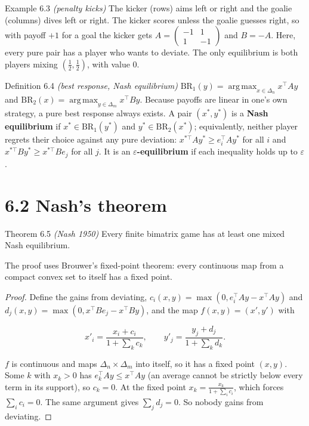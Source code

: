 \documentclass[11pt,a4paper,openany]{book}
\newcommand{\eps}{\varepsilon}
\DeclareMathOperator*{\argmax}{arg\,max}
\newcommand{\simplex}{\Delta}
\begin{document}
\begin{bexample}{Example 6.3 \emph{(penalty kicks)}}
The kicker (rows) aims left or right and the goalie (columns) dives left or right. The kicker scores unless the goalie guesses right, so with payoff $+1$ for a goal the kicker gets $A=\begin{pmatrix}-1&1\\1&-1\end{pmatrix}$ and $B=-A$. Here, every pure pair has a player who wants to deviate. The only equilibrium is both players mixing $(\tfrac12,\tfrac12)$, with value $0$.
\end{bexample}

\begin{bdef}{Definition 6.4 \emph{(best response, Nash equilibrium)}}
$\mathrm{BR}_1(y)=\argmax_{x\in\simplex_n}x^\top Ay$ and $\mathrm{BR}_2(x)=\argmax_{y\in\simplex_m}x^\top By$. Because payoffs are linear in one's own strategy, a pure best response always exists. A pair $(x^*,y^*)$ is a \textbf{Nash equilibrium} if $x^*\in\mathrm{BR}_1(y^*)$ and $y^*\in\mathrm{BR}_2(x^*)$; equivalently, neither player regrets their choice against any pure deviation: $x^{*\top}Ay^*\ge e_i^\top Ay^*$ for all $i$ and $x^{*\top}By^*\ge x^{*\top}Be_j$ for all $j$. It is an \textbf{$\eps$-equilibrium} if each inequality holds up to $\eps$.
\end{bdef}

\section*{6.2 Nash's theorem}\label{ch6-nash}

\begin{bthm}{Theorem 6.5 \emph{(Nash 1950)}}
Every finite bimatrix game has at least one mixed Nash equilibrium.
\end{bthm}

The proof uses Brouwer's fixed-point theorem: every continuous map from a compact convex set to itself has a fixed point.

\begin{proof}
Define the gains from deviating, $c_i(x,y)=\max(0,e_i^\top Ay-x^\top Ay)$ and $d_j(x,y)=\max(0,x^\top Be_j-x^\top By)$, and the map $f(x,y)=(x',y')$ with

\[x'_i=\frac{x_i+c_i}{1+\sum_kc_k},\qquad y'_j=\frac{y_j+d_j}{1+\sum_kd_k}.\]

$f$ is continuous and maps $\simplex_n\times\simplex_m$ into itself, so it has a fixed point $(x,y)$. Some $k$ with $x_k>0$ has $e_k^\top Ay\le x^\top Ay$ (an average cannot be strictly below every term in its support), so $c_k=0$. At the fixed point $x_k=\frac{x_k}{1+\sum_ic_i}$, which forces $\sum_ic_i=0$. The same argument gives $\sum_jd_j=0$. So nobody gains from deviating.
\end{proof}
\end{document}
